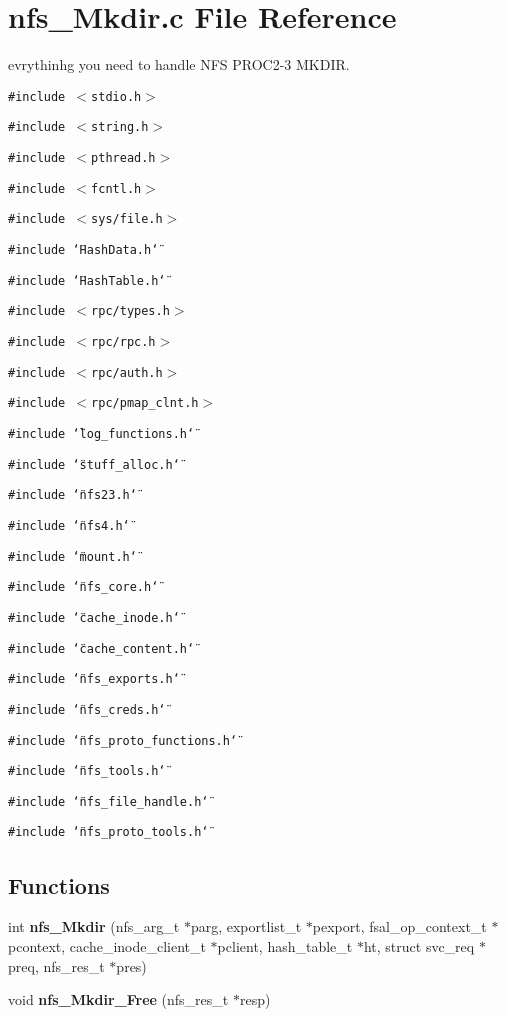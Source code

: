 \section{nfs\_\-Mkdir.c File Reference}
\label{nfs__Mkdir_8c}
evrythinhg you need to handle NFS PROC2-3 MKDIR.  


{\tt \#include $<$stdio.h$>$}\par
{\tt \#include $<$string.h$>$}\par
{\tt \#include $<$pthread.h$>$}\par
{\tt \#include $<$fcntl.h$>$}\par
{\tt \#include $<$sys/file.h$>$}\par
{\tt \#include \char`\"{}HashData.h\char`\"{}}\par
{\tt \#include \char`\"{}HashTable.h\char`\"{}}\par
{\tt \#include $<$rpc/types.h$>$}\par
{\tt \#include $<$rpc/rpc.h$>$}\par
{\tt \#include $<$rpc/auth.h$>$}\par
{\tt \#include $<$rpc/pmap\_\-clnt.h$>$}\par
{\tt \#include \char`\"{}log\_\-functions.h\char`\"{}}\par
{\tt \#include \char`\"{}stuff\_\-alloc.h\char`\"{}}\par
{\tt \#include \char`\"{}nfs23.h\char`\"{}}\par
{\tt \#include \char`\"{}nfs4.h\char`\"{}}\par
{\tt \#include \char`\"{}mount.h\char`\"{}}\par
{\tt \#include \char`\"{}nfs\_\-core.h\char`\"{}}\par
{\tt \#include \char`\"{}cache\_\-inode.h\char`\"{}}\par
{\tt \#include \char`\"{}cache\_\-content.h\char`\"{}}\par
{\tt \#include \char`\"{}nfs\_\-exports.h\char`\"{}}\par
{\tt \#include \char`\"{}nfs\_\-creds.h\char`\"{}}\par
{\tt \#include \char`\"{}nfs\_\-proto\_\-functions.h\char`\"{}}\par
{\tt \#include \char`\"{}nfs\_\-tools.h\char`\"{}}\par
{\tt \#include \char`\"{}nfs\_\-file\_\-handle.h\char`\"{}}\par
{\tt \#include \char`\"{}nfs\_\-proto\_\-tools.h\char`\"{}}\par
\subsection*{Functions}
\begin{CompactItemize}
\item 
int {\bf nfs\_\-Mkdir} (nfs\_\-arg\_\-t $\ast$parg, exportlist\_\-t $\ast$pexport, fsal\_\-op\_\-context\_\-t $\ast$pcontext, cache\_\-inode\_\-client\_\-t $\ast$pclient, hash\_\-table\_\-t $\ast$ht, struct svc\_\-req $\ast$preq, nfs\_\-res\_\-t $\ast$pres)
\item 
void {\bf nfs\_\-Mkdir\_\-Free} (nfs\_\-res\_\-t $\ast$resp)
\end{CompactItemize}



